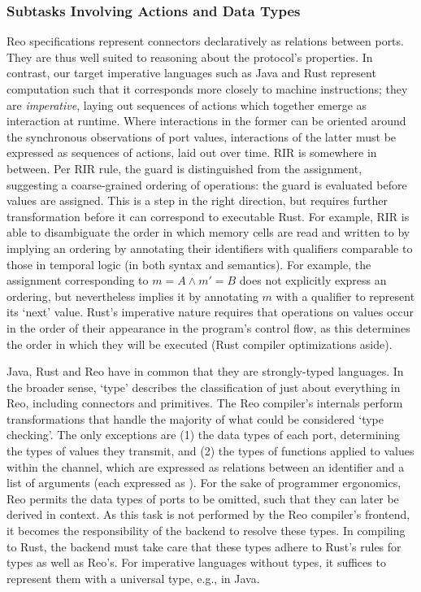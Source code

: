 \subsubsection{Subtasks Involving Actions and Data Types}
Reo specifications represent connectors declaratively as relations between ports. They are thus well suited to reasoning about the protocol's properties. In contrast, our target imperative languages such as Java and Rust represent computation such that it corresponds more closely to machine instructions; they are \textit{imperative}, laying out sequences of actions which together emerge as interaction at runtime. Where interactions in the former can be oriented around the synchronous observations of port values, interactions of the latter must be expressed as sequences of actions, laid out over time. RIR is somewhere in between. Per RIR rule, the guard is distinguished from the assignment, suggesting a coarse-grained ordering of operations: the guard is evaluated before values are assigned. This is a step in the right direction, but requires further transformation before it can correspond to executable Rust. For example, RIR is able to disambiguate the order in which memory cells are read and written to by implying an ordering by annotating their identifiers with qualifiers comparable to those in temporal logic (in both syntax and semantics). For example, the assignment corresponding to $m=A\wedge{}m'=B$ does not explicitly express an ordering, but nevertheless implies it by annotating $m$ with a qualifier to represent its `next' value. Rust's imperative nature requires that operations on values occur in the order of their appearance in the program's control flow, as this determines the order in which they will be executed (Rust compiler optimizations aside).

Java, Rust and Reo have in common that they are strongly-typed languages. In the broader sense, `type' describes the classification of just about everything in Reo, including connectors and primitives. The Reo compiler's internals perform transformations that handle the majority of what could be considered `type checking'. The only exceptions are (1) the data types of each port, determining the types of values they transmit, and (2) the types of functions applied to values within the channel, which are expressed as relations between an identifier and a list of arguments (each expressed as ). For the sake of programmer ergonomics, Reo permits the data types of ports to be omitted, such that they can later be derived in context. As this task is not performed by the Reo compiler's frontend, it becomes the responsibility of the backend to resolve these types. In compiling to Rust, the backend must take care that these types adhere to Rust's rules for types as well as Reo's. For imperative languages without types, it suffices to represent them with a universal type, e.g.,  in Java.

